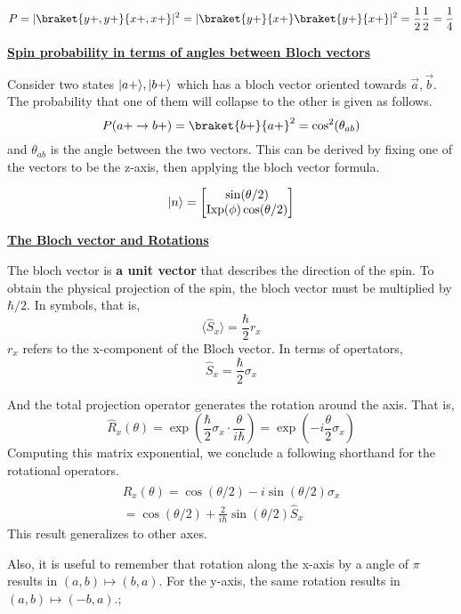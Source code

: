 \documentclass{article}
\DeclarePairedDelimiter\ket{\lvert}{\rangle}
\newcommand{\new}[1]{
    \vspace{2mm}
    \noindent
    \textbf{
    \underline{#1}}
}
\newcommand{\Ixp}{
    {
        \textrm{Ixp}
    }
}
\begin{document}
\[
    P = |\braket{y+,y+}{x+,x+}|^2
    = |\braket{y+}{x+} \braket{y+}{x+}|^2
    = \frac 1 2 \frac 1 2 = \frac 1 4
\]

\new{Spin probability in terms of angles between Bloch vectors}
Consider two states $\ket{a+}, \ket{b+}$ which has a bloch 
vector oriented towards $\vec a, \vec b$. The probability that 
one of them will collapse to the other is given as follows. 
\[
    P(a+ \rightarrow b+) = \braket{b+}{a+}^2 = 
    \cos^2(\theta_{ab})
\]
and $\theta_{ab}$ is the angle between the two vectors. 
This can be derived by fixing one of the vectors to 
be the z-axis, then applying the bloch vector formula. 

\[
    \ket{n} = 
    \begin{bmatrix}
        \sin(\theta / 2)\\
        \Ixp(\phi) \cos(\theta /2)
    \end{bmatrix}
\]

\new{The Bloch vector and Rotations}

The bloch vector is \textbf{a unit vector} that describes 
the direction of the spin. To obtain the physical projection 
of the spin, the bloch vector must be multiplied by $\hbar /2$. 
In symbols, that is, 
\[
    \langle\hat{S}_x\rangle = 
    \frac \hbar 2 r_x
\]
$r_x$ refers to the x-component of the Bloch vector. In terms of 
opertators, 
\[
    \hat{S}_x = \frac \hbar 2 
     \sigma_x
\]

And the total projection operator generates the rotation around 
the axis. That is, 
\[
    \hat{R}_x(\theta) = \exp{\left(
        \frac \hbar 2 \sigma_x
        \cdot
    \frac \theta {i \hbar}\right) }
    = 
    \exp \left(
        -i \frac \theta 2 \sigma_x
    \right)
\]
Computing this matrix exponential, we conclude a following 
shorthand for the rotational operators. 
\begin{equation}
\begin{split}
    \hat{R}_x(\theta) = \cos(\theta/2) - i \sin(\theta/2) \sigma_x 
    \\  = \cos(\theta/2) + \frac 2 {i\hbar} \sin(\theta/2) \hat{S}_x
\end{split}
\end{equation}
This result generalizes to other axes. 

Also, it is useful to remember that rotation along the x-axis 
by a angle of $\pi$ results in $(a, b) \mapsto(b, a)$. For the 
y-axis, the same rotation results in $(a, b) \mapsto (-b, a)$.; 

\newpage
\end{document}
